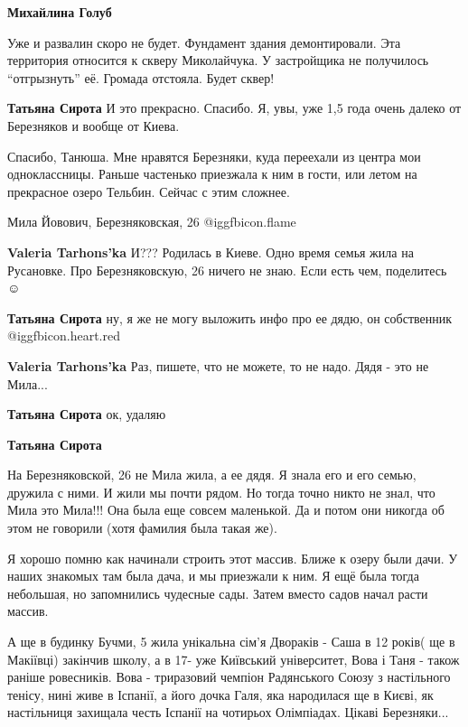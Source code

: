 \begin{itemize}
\begin{itemize}
\textbf{Михайлина Голуб} 

Уже и развалин скоро не будет. Фундамент здания демонтировали.  Эта территория
относится к скверу Миколайчука. У застройщика не получилось
\enquote{отгрызнуть} её. Громада отстояла.  Будет сквер!

\textbf{Татьяна Сирота} И это прекрасно. Спасибо. Я, увы, уже 1,5 года очень
далеко от Березняков и вообще от Киева.
\end{itemize} %


Спасибо, Танюша. Мне нравятся Березняки, куда переехали из центра мои
одноклассницы. Раньше частенько приезжала к ним в гости, или летом на прекрасное
озеро Тельбин. Сейчас с этим сложнее.

Мила Йовович, Березняковская, 26 @igg{fbicon.flame} 

\begin{itemize} %
\textbf{Valeria Tarhons'ka} И???
Родилась в Киеве. Одно время семья жила на Русановке. Про Березняковскую, 26
ничего не знаю. Если есть чем, поделитесь ☺ ️ 

\textbf{Татьяна Сирота} ну, я же не могу выложить инфо про ее дядю, он собственник @igg{fbicon.heart.red}

\textbf{Valeria Tarhons'ka}
Раз, пишете, что не можете, то не надо.
Дядя - это не Мила...

\textbf{Татьяна Сирота} ок, удаляю

\textbf{Татьяна Сирота} 

На Березняковской, 26 не Мила жила, а ее дядя. Я знала его и его семью, дружила
с ними. И жили мы почти рядом. Но тогда точно никто не знал, что Мила это
Мила!!! Она была еще совсем маленькой. Да и потом они никогда об этом не
говорили (хотя фамилия была такая же).

\end{itemize} %


Я хорошо помню как начинали строить этот массив. Ближе к озеру были дачи. У
наших знакомых там была дача, и мы приезжали к ним. Я ещё была тогда небольшая,
но запомнились чудесные сады. Затем вместо садов начал расти массив.


А ще в будинку Бучми, 5 жила унікальна сім'я Двораків - Саша в 12 років( ще в
Макіївці) закінчив школу, а в 17- уже Київський університет, Вова і Таня -
також раніше ровесників. Вова - триразовий чемпіон Радянського Союзу з
настільного тенісу, нині живе в Іспанії, а його дочка Галя, яка народилася ще в
Києві, як настільниця захищала честь Іспанії на чотирьох Олімпіадах. Цікаві
Березняки...


\end{itemize}

